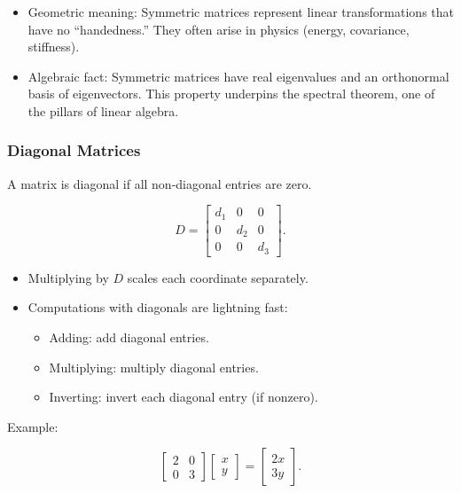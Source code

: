 \documentclass[
  letterpaper,
  DIV=11,
  numbers=noendperiod]{scrreprt}
\providecommand{\tightlist}{%
  \setlength{\itemsep}{0pt}\setlength{\parskip}{0pt}}
\begin{document}
\begin{itemize}
\tightlist
\item
  Geometric meaning: Symmetric matrices represent linear transformations
  that have no ``handedness.'' They often arise in physics (energy,
  covariance, stiffness).
\item
  Algebraic fact: Symmetric matrices have real eigenvalues and an
  orthonormal basis of eigenvectors. This property underpins the
  spectral theorem, one of the pillars of linear algebra.
\end{itemize}

\subsubsection{Diagonal Matrices}\label{diagonal-matrices}

A matrix is diagonal if all non-diagonal entries are zero.

\[
D = \begin{bmatrix} 
d_1 & 0 & 0 \\ 
0 & d_2 & 0 \\ 
0 & 0 & d_3 
\end{bmatrix}.
\]

\begin{itemize}
\item
  Multiplying by \(D\) scales each coordinate separately.
\item
  Computations with diagonals are lightning fast:

  \begin{itemize}
  \tightlist
  \item
    Adding: add diagonal entries.
  \item
    Multiplying: multiply diagonal entries.
  \item
    Inverting: invert each diagonal entry (if nonzero).
  \end{itemize}
\end{itemize}

Example:

\[
\begin{bmatrix} 
2 & 0 \\ 
0 & 3 
\end{bmatrix}
\begin{bmatrix} 
x \\ 
y
\end{bmatrix}
=
\begin{bmatrix} 
2x \\ 
3y
\end{bmatrix}.
\]
\end{document}
